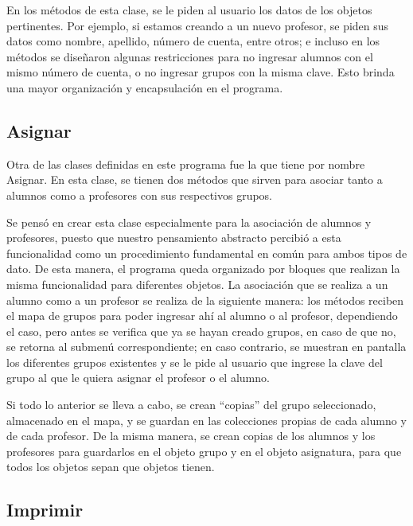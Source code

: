 \documentclass[11pt]{article}
\begin{document}
En los métodos de esta clase, se le piden al usuario los datos de los 
objetos pertinentes. Por ejemplo, si estamos creando a un nuevo 
profesor, se piden sus datos como nombre, apellido, número de cuenta, 
entre otros; e incluso en los métodos se diseñaron algunas 
restricciones para no ingresar alumnos con el mismo número de cuenta, 
o no ingresar grupos con la misma clave. Esto brinda una mayor 
organización y encapsulación en el programa.

\subsection{Asignar}

\par

Otra de las clases definidas en este programa fue la que tiene por 
nombre Asignar. En esta clase, se tienen dos métodos que sirven para 
asociar tanto a alumnos como a profesores con sus respectivos grupos.

\par

Se pensó en crear esta clase especialmente para la asociación de 
alumnos y profesores, puesto que nuestro pensamiento abstracto 
percibió a esta funcionalidad como un procedimiento fundamental en 
común para ambos tipos de dato. De esta manera, el programa queda 
organizado por bloques que realizan la misma funcionalidad para 
diferentes objetos. La asociación que se realiza a un alumno como a 
un profesor se realiza de la siguiente manera: los métodos reciben el 
mapa de grupos para poder ingresar ahí al alumno o al profesor, 
dependiendo el caso, pero antes se verifica que ya se hayan creado 
grupos, en caso de que no, se retorna al submenú correspondiente; en 
caso contrario, se muestran en pantalla los diferentes grupos 
existentes y se le pide al usuario que ingrese la clave del grupo al 
que le quiera asignar el profesor o el alumno.

\par

Si todo lo anterior se lleva a cabo, se crean “copias” del grupo 
seleccionado, almacenado en el mapa, y se guardan en las colecciones 
propias de cada alumno y de cada profesor. De la misma manera, se 
crean copias de los alumnos y los profesores para guardarlos en el 
objeto grupo y en el objeto asignatura, para que todos los objetos 
sepan que objetos tienen.
\subsection{Imprimir}
\par
\end{document}

